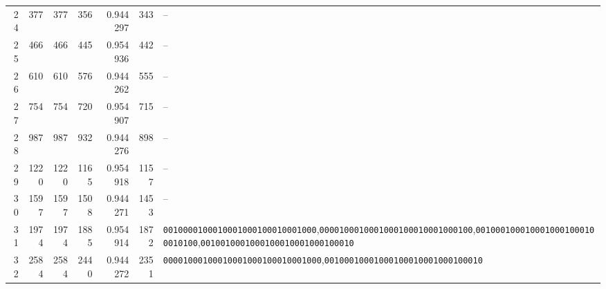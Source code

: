 \begin{table}[H]
\begin{tabular}{r r r r r r l}
24 & 377 & 377 & 356 & 0.944297 & 343 & --\\
25 & 466 & 466 & 445 & 0.954936 & 442 & --\\
26 & 610 & 610 & 576 & 0.944262 & 555 & --\\
27 & 754 & 754 & 720 & 0.954907 & 715 & --\\
28 & 987 & 987 & 932 & 0.944276 & 898 & --\\
29 & 1220 & 1220 & 1165 & 0.954918 & 1157 & --\\
30 & 1597 & 1597 & 1508 & 0.944271 & 1453 & --\\
31 & 1974 & 1974 & 1885 & 0.954914 & 1872 & \texttt{0010000100010001000100010001000},\;\texttt{0000100010001000100010001000100},\;\texttt{0010001000100010001000100010100},\;\texttt{0010010001000100010001000100010}\\
32 & 2584 & 2584 & 2440 & 0.944272 & 2351 & \texttt{00001000100010001000100010001000},\;\texttt{00100010001000100010001000100010}\\
\bottomrule
\end{tabular}
\end{table}

